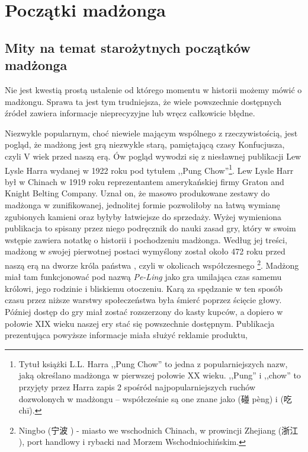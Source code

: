 \section{Początki madżonga}
\subsection{Mity na temat starożytnych początków madżonga}
Nie jest kwestią prostą ustalenie od którego momentu w historii możemy mówić o
madżongu. Sprawa ta jest tym trudniejsza, że wiele powszechnie dostępnych źródeł
zawiera informacje nieprecyzyjne lub wręcz całkowicie błędne. 

Niezwykle popularnym, choć niewiele mającym wspólnego z rzeczywistością, jest
pogląd, że madżong jest grą niezwykle starą, pamiętającą czasy Konfucjusza,
czyli V wiek przed naszą erą. Ów pogląd wywodzi się z niesławnej publikacji Lew
Lysle Harra wydanej w 1922 roku pod tytułem ,,Pung Chow''\footnote{Tytuł książki
L.L. Harra ,,Pung Chow'' to jedna z popularniejszych nazw, jaką określano
madżonga w pierwszej połowie XX wieku. ,,Pung'' i ,,chow'' to przyjęty przez
Harra zapis 2 spośród najpopularniejszych ruchów dozwolonych w madżongu --
współcześnie są one znane jako  (碰 pèng) i  (吃 chī).}.
Lew Lysle Harr był w Chinach w 1919 roku reprezentantem amerykańskiej firmy
Graton and Knight Belting Company. Uznał on, że masowo produkowane zestawy do
madżonga w zunifikowanej, jednolitej formie pozwoliłoby na łatwą wymianę
zgubionych kamieni oraz byłyby łatwiejsze do sprzedaży.
Wyżej wymieniona publikacja to spisany przez niego podręcznik do nauki zasad
gry, który w swoim wstępie zawiera notatkę o historii i pochodzeniu madżonga.
Według jej treści, madżong w swojej pierwotnej postaci wymyślony został około
472 roku przed naszą erą na dworze króla państwa , czyli w okolicach
współczesnego \footnote{Ningbo (宁波 ) - miasto we
wschodnich Chinach, w prowincji Zhejiang (浙江 ), port handlowy i
rybacki nad Morzem Wschodniochińskim.}. Madżong miał tam funkcjonować pod nazwą
\textit{Pe-Ling} jako gra umilająca czas samemu królowi, jego rodzinie i
bliskiemu otoczeniu. Karą za spędzanie w ten sposób czasu przez niższe warstwy
społeczeństwa była śmierć poprzez ścięcie głowy. Później dostęp do gry miał
zostać rozszerzony do kasty kupców, a dopiero w połowie XIX wieku naszej ery
stać się powszechnie dostępnym.
Publikacja prezentująca powyższe informacje miała służyć reklamie produktu,
